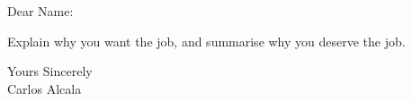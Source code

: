 \documentclass[a4paper,english]{friggeri-letter}
\begin{document}

\address{
   1406 E Russell Ave, Upper \\
   Milwaukee, WI
}







\opening{Dear Name:}

Explain why you want the job, and summarise why you deserve the job.


\closing{
   Yours Sincerely\\
   Carlos Alcala}
\end{document}
